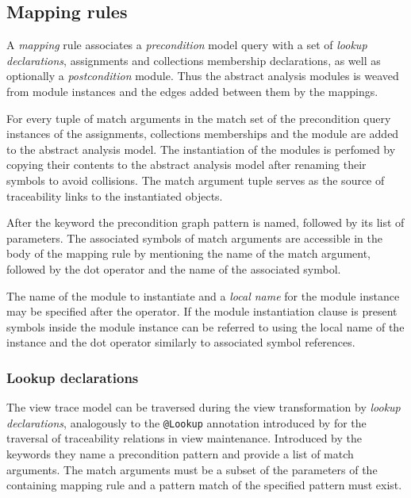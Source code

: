 \subsection{Mapping rules}

A \emph{mapping} rule associates a \emph{precondition} model query with a set of \emph{lookup declarations}, assignments and collections membership declarations, as well as optionally a \emph{postcondition}  module. Thus the abstract analysis modules is weaved from  module instances and the edges added between them by the mappings.

For every tuple of match arguments in the match set of the precondition query instances of the assignments, collections memberships and the  module are added to the abstract analysis model. The instantiation of the  modules is perfomed by copying their contents to the abstract analysis model after renaming their symbols to avoid collisions. The match argument tuple serves as the source of traceability links to the instantiated objects.

After the keyword  the precondition graph pattern is named, followed by its list of parameters. The associated symbols of match arguments are accessible in the body of the mapping rule by mentioning the name of the match argument, followed by the dot operator and the name of the associated symbol.

The name of the  module to instantiate and a \emph{local name} for the module instance may be specified after the \lit{=>} operator. If the module instantiation clause is present symbols inside the module instance can be referred to using the local name of the instance and the dot operator similarly to associated symbol references.

\subsubsection{Lookup declarations}

The view trace model can be traversed during the view transformation by \emph{lookup declarations}, analogously to the \texttt{@Lookup} annotation introduced by \citet{Debreceni14viewmodel} for the traversal of traceability relations in view maintenance. Introduced by the keywords  they name a precondition pattern and provide a list of match arguments. The match arguments must be a subset of the parameters of the containing mapping rule and a pattern match of the specified pattern must exist.

